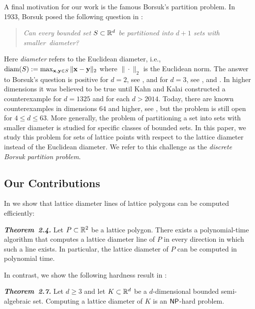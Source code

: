 A final motivation for our work is the famous Borsuk's partition problem. In 1933, Borsuk posed the following question in \cite{borsuk1933drei}:
\begin{quote}
    \emph{Can every bounded set $S \subset \mathbb{R}^d$ be partitioned into $d+1$ sets with \mbox{smaller diameter?}}
\end{quote}
Here \textit{diameter} refers to the Euclidean diameter, i.e., $\operatorname{diam}(S) := \max_{\mathbf{x},\mathbf{y} \in S} \|\mathbf{x}-\mathbf{y}\|_2$ where $\| \cdot \|_2$ is the Euclidean norm.
The answer to Borsuk's question is positive for $d=2$, see \cite{borsuk1933drei}, and for $d=3$, see \cite{perkal1947subdivision}, \cite{eggleston1955covering} and \cite{grunbaum1957simple}. In higher dimensions it was believed to be true until Kahn and Kalai \cite{kahn1993counterexample} constructed a counterexample for $d=1325$ and for each $d>2014$. Today, there are known counterexamples in dimensions $64$ and higher, see \cite{jenrich201464}, but the problem is still open for $4\leq d\leq 63$.
More generally, the problem of partitioning a set into sets with smaller diameter is studied for specific classes of bounded sets. In this paper, we study this problem for sets of lattice points with respect to the lattice diameter instead of the Euclidean diameter. We refer to this challenge as the \textit{discrete Borsuk partition problem}.

\subsection*{Our Contributions}

In  we show that lattice diameter lines of lattice polygons can be computed efficiently:

\begin{manualthm}\emph{\textbf{Theorem~2.4.}}
    Let $P \subset \mathbb{R}^2 $ be a lattice polygon. There exists a polynomial-time algorithm that computes a lattice diameter line of $P$ in every direction in which such a line exists. In particular, the lattice diameter of $P$ can be computed in polynomial time.
\end{manualthm} 

In contrast, we show the following hardness result in :

\begin{manualthm}\textbf{\emph{Theorem~2.7.}}
    Let $d \geq 3$ and let $K \subset \mathbb{R}^d$ be a $d$-dimensional bounded semi-algebraic set. \mbox{Computing} a lattice diameter of $K$ is an $\operatorname{\mathsf{NP}}$-hard problem. 
\end{manualthm}

